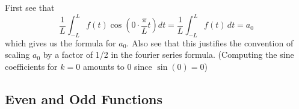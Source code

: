 \documentclass{report}
\begin{document}
First see that
\begin{equation*}
\frac{1}{L}\int^L_{-L}f(t)\cos\left(0\cdot\frac{\pi}{L}t\right)dt=\frac{1}{L}\int^L_{-L}f(t)\,dt=a_0
\end{equation*}
which gives us the formula for $a_0$. Also see that this justifies the convention of scaling $a_0$ by a 
factor of 1/2 in the fourier series formula. (Computing the sine coefficients for $k=0$ amounts to 0 since $\sin(0)=0$)
\newpage
\subsection{Even and Odd Functions}
\end{document}

